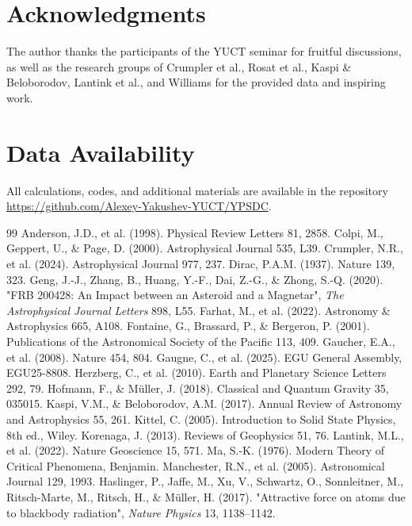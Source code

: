 \documentclass[12pt]{article}
\theoremstyle{remark}
\begin{document}
	\section*{Acknowledgments}
	The author thanks the participants of the YUCT seminar for fruitful discussions, as well as the research groups of Crumpler et al., Rosat et al., Kaspi \& Beloborodov, Lantink et al., and Williams for the provided data and inspiring work.
	
	\section*{Data Availability}
	All calculations, codes, and additional materials are available in the repository \url{https://github.com/Alexey-Yakushev-YUCT/YPSDC}.
	
	\begin{thebibliography}{99}
		 Anderson, J.D., et al. (1998). Physical Review Letters 81, 2858.
		 Colpi, M., Geppert, U., \& Page, D. (2000). Astrophysical Journal 535, L39.
		 Crumpler, N.R., et al. (2024). Astrophysical Journal 977, 237.
		 Dirac, P.A.M. (1937). Nature 139, 323.
		 Geng, J.-J., Zhang, B., Huang, Y.-F., Dai, Z.-G., \& Zhong, S.-Q. (2020). "FRB 200428: An Impact between an Asteroid and a Magnetar", \emph{The Astrophysical Journal Letters} 898, L55.
		 Farhat, M., et al. (2022). Astronomy \& Astrophysics 665, A108.
		 Fontaine, G., Brassard, P., \& Bergeron, P. (2001). Publications of the Astronomical Society of the Pacific 113, 409.
		 Gaucher, E.A., et al. (2008). Nature 454, 804.
		 Gaugne, C., et al. (2025). EGU General Assembly, EGU25-8808.
		 Herzberg, C., et al. (2010). Earth and Planetary Science Letters 292, 79.
		 Hofmann, F., \& Müller, J. (2018). Classical and Quantum Gravity 35, 035015.
		 Kaspi, V.M., \& Beloborodov, A.M. (2017). Annual Review of Astronomy and Astrophysics 55, 261.
		 Kittel, C. (2005). Introduction to Solid State Physics, 8th ed., Wiley.
		 Korenaga, J. (2013). Reviews of Geophysics 51, 76.
		 Lantink, M.L., et al. (2022). Nature Geoscience 15, 571.
		 Ma, S.-K. (1976). Modern Theory of Critical Phenomena, Benjamin.
		 Manchester, R.N., et al. (2005). Astronomical Journal 129, 1993.
		 Haslinger, P., Jaffe, M., Xu, V., Schwartz, O., Sonnleitner, M., Ritsch-Marte, M., Ritsch, H., \& Müller, H. (2017). "Attractive force on atoms due to blackbody radiation", \emph{Nature Physics} 13, 1138–1142.

\end{thebibliography}
\end{document}
